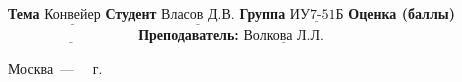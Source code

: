 \begin{titlepage}
      \noindent\textbf{Тема} $\underline{\text{Конвейер}}$\newline\newline
      \noindent\textbf{Студент} $\underline{\text{Власов Д.В.}}$\newline\newline
      \noindent\textbf{Группа} $\underline{\text{ИУ7-51Б}}$\newline\newline
      \noindent\textbf{Оценка (баллы)} $\underline{\text{~~~~~~~~~~~~~~~~~~~~~~~~~~~}}$\newline\newline
      \noindent\textbf{Преподаватель: } $\underline{\text{Волкова Л.Л.}}$\newline\newline\newline
      
      \begin{center}
          \vfill
          Москва~---~\the\year
          ~г.
      \end{center}
  \end{titlepage}
  
